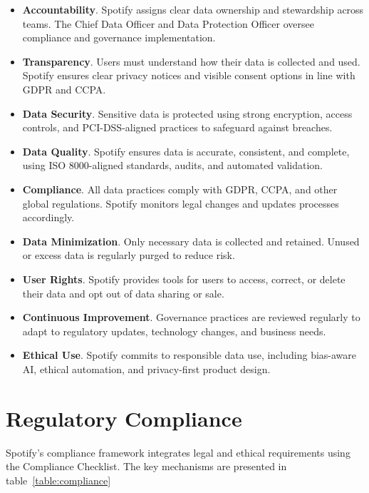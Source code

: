 \documentclass[11pt,a4paper,computermodern]{article}
\begin{document}
\begin{itemize}[itemsep=5pt, parsep=0pt]
	\item \textbf{Accountability}. Spotify assigns clear data ownership and stewardship across teams. The Chief Data Officer and Data Protection Officer oversee compliance and governance implementation.
	\item \textbf{Transparency}. Users must understand how their data is collected and used. Spotify ensures clear privacy notices and visible consent options in line with GDPR and CCPA.
	\item \textbf{Data Security}. Sensitive data is protected using strong encryption, access controls, and PCI-DSS-aligned practices to safeguard against breaches.
	\item \textbf{Data Quality}. Spotify ensures data is accurate, consistent, and complete, using ISO 8000-aligned standards, audits, and automated validation.
	\item \textbf{Compliance}. All data practices comply with GDPR, CCPA, and other global regulations. Spotify monitors legal changes and updates processes accordingly.
	\item \textbf{Data Minimization}. Only necessary data is collected and retained. Unused or excess data is regularly purged to reduce risk.
	\item \textbf{User Rights}. Spotify provides tools for users to access, correct, or delete their data and opt out of data sharing or sale.
	\item \textbf{Continuous Improvement}. Governance practices are reviewed regularly to adapt to regulatory updates, technology changes, and business needs.
	\item \textbf{Ethical Use}. Spotify commits to responsible data use, including bias-aware AI, ethical automation, and privacy-first product design.
\end{itemize}



\section*{Regulatory Compliance}

Spotify’s compliance framework integrates legal and ethical requirements using the Compliance Checklist. The key mechanisms are presented in table~\ref{table:compliance}
\end{document}
